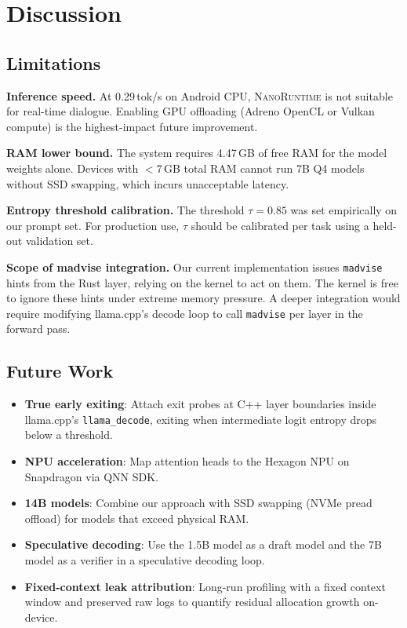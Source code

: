 \documentclass[11pt]{article}
\newcommand{\nanort}{\textsc{NanoRuntime}}
\begin{document}
\section{Discussion}
\label{sec:discussion}

\subsection{Limitations}

\textbf{Inference speed.}
At 0.29\,tok/s on Android CPU, \nanort{} is not suitable for
real-time dialogue. Enabling GPU offloading (Adreno OpenCL or Vulkan
compute) is the highest-impact future improvement.

\textbf{RAM lower bound.}
The system requires 4.47\,GB of free RAM for the model weights alone.
Devices with $<$7\,GB total RAM cannot run 7B Q4 models without SSD
swapping, which incurs unacceptable latency.

\textbf{Entropy threshold calibration.}
The threshold $\tau = 0.85$ was set empirically on our prompt set.
For production use, $\tau$ should be calibrated per task using a
held-out validation set.

\textbf{Scope of madvise integration.}
Our current implementation issues \texttt{madvise} hints from the Rust
layer, relying on the kernel to act on them.
The kernel is free to ignore these hints under extreme memory pressure.
A deeper integration would require modifying llama.cpp's decode loop to
call \texttt{madvise} per layer in the forward pass.

\subsection{Future Work}

\begin{itemize}
  \item \textbf{True early exiting}: Attach exit probes at C++ layer
    boundaries inside llama.cpp's \texttt{llama\_decode}, exiting when
    intermediate logit entropy drops below a threshold.
  \item \textbf{NPU acceleration}: Map attention heads to the Hexagon
    NPU on Snapdragon via QNN SDK.
  \item \textbf{14B models}: Combine our approach with SSD swapping
    (NVMe pread offload) for models that exceed physical RAM.
  \item \textbf{Speculative decoding}: Use the 1.5B model as a draft
    model and the 7B model as a verifier in a speculative decoding loop.
  \item \textbf{Fixed-context leak attribution}: Long-run profiling with a
    fixed context window and preserved raw logs to quantify residual
    allocation growth on-device.
\end{itemize}
\end{document}

